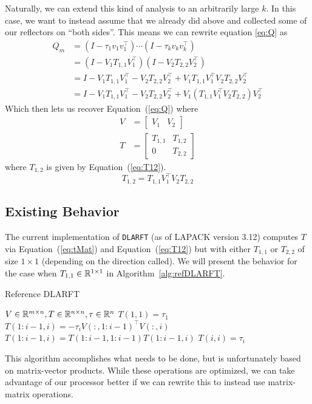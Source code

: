 \documentclass[12pt]{article}
\begin{document}
    Naturally, we can extend this kind of analysis to an arbitrarily large $k$. In this case, we want to
    instead assume that we already did above and collected some of our reflectors on ``both sides''. This means
    we can rewrite equation \ref{eq:Q} as
    \begin{align*}
        Q_m &= \left(I-\tau_1v_1v_1^\top\right)\cdots\left(I-\tau_kv_kv_k^\top\right) \\
            &= \left(I - V_1T_{1,1}V_1^\top\right)\left(I - V_2T_{2,2}V_2^\top\right) \\
            &= I - V_1T_{1,1}V_1^\top - V_2T_{2,2}V_2^\top + V_1T_{1,1}V_1^\top V_2T_{2,2}V_2^\top \\
            &= I - V_1T_{1,1}V_1^\top - V_2T_{2,2}V_2^\top + V_1\left(T_{1,1}V_1^\top V_2T_{2,2}\right)V_2^\top
    \end{align*}
    Which then lets us recover Equation~(\ref{eq:Q}) where
    \begin{align}
        V &= \begin{bmatrix} V_1 & V_2 \end{bmatrix} \label{eq:vMat} \\
        T &= \begin{bmatrix} T_{1,1} & T_{1,2} \\
        0 & T_{2,2}\end{bmatrix} \label{eq:tMat}
    \end{align}
    where $T_{1,2}$ is given by Equation~(\ref{eq:T12}).
    \begin{equation}\label{eq:T12}
        T_{1,2} = T_{1,1}V_1^\top V_2T_{2,2}
    \end{equation}


    \subsection{Existing Behavior}
    The current implementation of \verb|DLARFT| (as of LAPACK version 3.12) computes $T$ via Equation~(\ref{eq:tMat}) and Equation~(\ref{eq:T12}) but with either $T_{1,1}$ or $T_{2,2}$ of size $1\times 1$ (depending on the direction called). We will present the behavior for the case when $T_{1,1}\in\mathbb{R}^{1\times 1}$ in Algorithm~\ref{alg:refDLARFT}.

    \begin{algorithm}
        \caption{Reference DLARFT}\label{alg:refDLARFT}
        \begin{algorithmic}[1]
            \REQUIRE $V\in\mathbb{R}^{m\times n}, T\in\mathbb{R}^{n\times n}, \tau\in\mathbb{R}^{n}$ \hfill{}
            \STATE $T(1,1) = \tau_1$
                \STATE $T(1:i-1,i) = -\tau_iV(:,1:i-1)^\top V(:,i)$
                \STATE $T(1:i-1,i) = T(1:i-1,1:i-1)T(1:i-1,i)$
                \STATE $T(i,i) = \tau_i$
            \ENDFOR
        \end{algorithmic}
    \end{algorithm}
    This algorithm accomplishes what needs to be done, but is unfortunately based on matrix-vector products.
    While these operations are optimized, we can take advantage of our processor better if we can rewrite this
    to instead use matrix-matrix operations.
\end{document}
